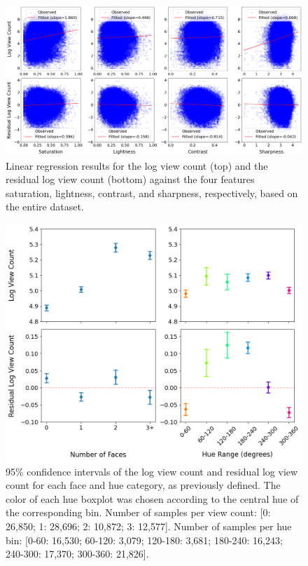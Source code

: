 \documentclass{article}
\begin{document}
\begin{figure}[h]


  \centering
  \includegraphics[width=\textwidth]{figs/lr.png}
  \caption{Linear regression results for the log view count (top) and the residual log view count (bottom) against the four features saturation, lightness, contrast, and sharpness, respectively, based on the entire dataset.}
  \label{fig:lr}
\end{figure}

\begin{figure}[h]
  \begin{minipage}[t]{0.67\textwidth}
    \vspace{0pt}  %
    \includegraphics[width=\textwidth]{figs/faces-and-hue.png}
  \end{minipage}%
  \hspace{0.05\textwidth}%
  \begin{minipage}[t]{0.27\textwidth}
    \vspace{0pt}  %
    \caption{95\% confidence intervals of the log view count and residual log view count for each face and hue category, as previously defined. The color of each hue boxplot was chosen according to the central hue of the corresponding bin. Number of samples per view count: [0: 26,850; 1: 28,696; 2: 10,872; 3: 12,577]. Number of samples per hue bin: [0-60: 16,530; 60-120: 3,079; 120-180: 3,681; 180-240: 16,243; 240-300: 17,370; 300-360: 21,826].}
    \label{fig:faces-and-hue}
  \end{minipage}
\end{figure}
\end{document}
